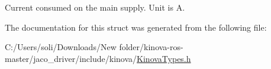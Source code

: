 Current consumed on the main supply. Unit is A. 



The documentation for this struct was generated from the following file\+:\begin{DoxyCompactItemize}
\item 
C\+:/\+Users/soli/\+Downloads/\+New folder/kinova-\/ros-\/master/jaco\+\_\+driver/include/kinova/\hyperlink{_kinova_types_8h}{Kinova\+Types.\+h}\end{DoxyCompactItemize}
